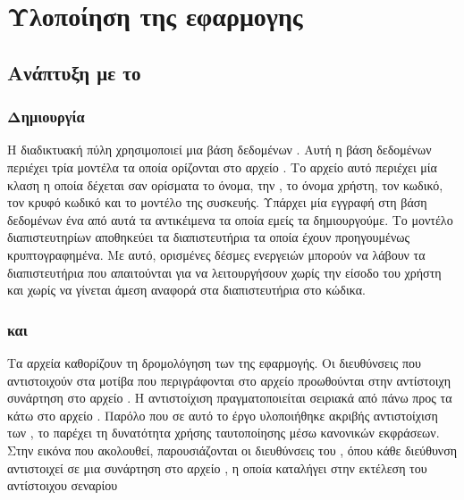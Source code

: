 \chapter{Υλοποίηση της εφαρμογης}

\section{Ανάπτυξη με το  }

\subsection{Δημιουργία }

Η διαδικτυακή πύλη χρησιμοποιεί μια βάση δεδομένων . Αυτή η βάση δεδομένων περιέχει τρία
μοντέλα τα οποία ορίζονται στο αρχείο . Το αρχείο αυτό περιέχει μία κλαση  η οποία δέχεται σαν ορίσματα
το όνομα, την , το όνομα χρήστη, τον κωδικό, τον κρυφό κωδικό και το μοντέλο της συσκευής.
Υπάρχει μία εγγραφή στη βάση δεδομένων ένα από αυτά τα αντικέιμενα τα οποία εμείς τα δημιουργούμε. Το μοντέλο διαπιστευτηρίων αποθηκεύει τα διαπιστευτήρια τα οποία έχουν προηγουμένως
κρυπτογραφημένα. Με αυτό, ορισμένες δέσμες ενεργειών μπορούν να λάβουν τα διαπιστευτήρια που απαιτούνται για να λειτουργήσουν
χωρίς την είσοδο του χρήστη και χωρίς να γίνεται άμεση αναφορά στα διαπιστευτήρια στο
κώδικα.



\subsection{ και }
Τα αρχεία  καθορίζουν τη δρομολόγηση των  της εφαρμογής. 
Οι διευθύνσεις  που αντιστοιχούν στα μοτίβα που περιγράφονται στο αρχείο  
προωθούνται στην αντίστοιχη συνάρτηση στο αρχείο . 
Η αντιστοίχιση πραγματοποιείται σειριακά από πάνω προς τα κάτω στο αρχείο . 
Παρόλο που σε αυτό το έργο υλοποιήθηκε ακριβής αντιστοίχιση των , το  παρέχει τη 
δυνατότητα χρήσης ταυτοποίησης μέσω κανονικών εκφράσεων. Στην εικόνα που ακολουθεί, παρουσιάζονται οι 
διευθύνσεις  του , όπου κάθε διεύθυνση αντιστοιχεί σε μια συνάρτηση στο αρχείο , 
η οποία καταλήγει στην εκτέλεση του αντίστοιχου σεναρίου


